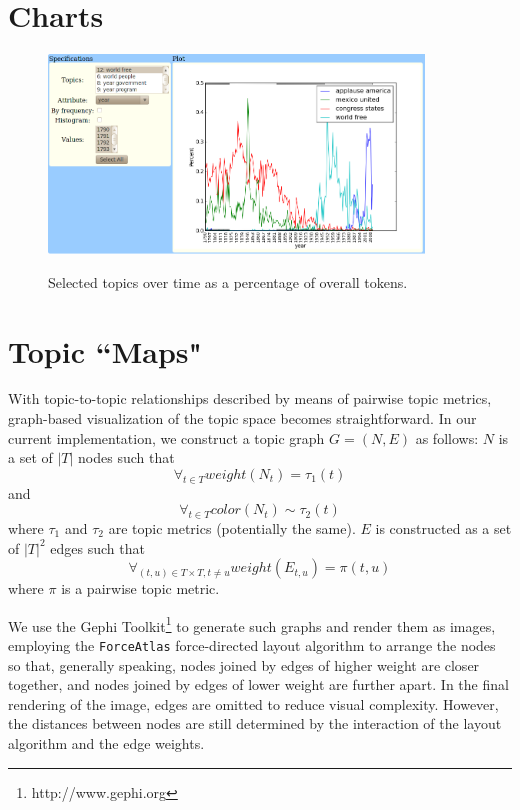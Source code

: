 \documentclass[11pt]{article}
\begin{document}
\section{Charts}

\begin{figure}[t]
 \centering
 \includegraphics[height=200px,keepaspectratio=true]{./topics_vs_years.png}
 \label{fig:chart}
 \caption{Selected topics over time as a percentage of overall tokens.}
\end{figure}

\section{Topic ``Maps"}\label{subsec:maps}
With topic-to-topic relationships described by means of pairwise topic metrics,
graph-based visualization of the topic space becomes straightforward. In our
current implementation, we construct a topic graph $G = (N, E)$ as follows:
$N$ is a set of $|T|$ nodes such that
\[\forall_{t\in T} weight(N_{t}) = \tau_{1}(t)\]
and
\[\forall_{t\in T} color(N_{t}) \sim \tau_{2}(t)\]
where $\tau_1$ and $\tau_2$ are topic metrics (potentially the same). $E$ is
constructed as a set of $|T|^2$ edges such that
  \[\forall_{(t,u)\in T\times T, t\neq u} weight(E_{t,u}) = \pi(t,u)\]
where $\pi$ is a pairwise topic metric.

We use the Gephi Toolkit\footnote{http://www.gephi.org} to generate such graphs
and render them as images, employing the \texttt{ForceAtlas} force-directed
layout algorithm to arrange the nodes so that, generally speaking, nodes joined
by edges of higher weight are closer together, and nodes joined by edges of
lower weight are further apart. In the final rendering of the image, edges
are omitted to reduce visual complexity. However, the distances between nodes
are still determined by the interaction of the layout algorithm and the edge
weights.
\end{document}

